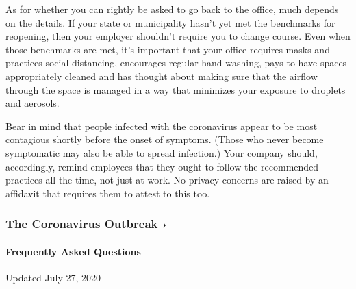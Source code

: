 As for whether you can rightly be asked to go back to the office, much
depends on the details. If your state or municipality hasn't yet met the
benchmarks for reopening, then your employer shouldn't require you to
change course. Even when those benchmarks are met, it's important that
your office requires masks and practices social distancing, encourages
regular hand washing, pays to have spaces appropriately cleaned and has
thought about making sure that the airflow through the space is managed
in a way that minimizes your exposure to droplets and aerosols.

Bear in mind that people infected with the coronavirus appear to be most
contagious shortly before the onset of symptoms. (Those who never become
symptomatic may also be able to spread infection.) Your company should,
accordingly, remind employees that they ought to follow the recommended
practices all the time, not just at work. No privacy concerns are raised
by an affidavit that requires them to attest to this too.

\href{https://www.nytimes3xbfgragh.onion/news-event/coronavirus?action=click\&pgtype=Article\&state=default\&region=MAIN_CONTENT_3\&context=storylines_faq}{}

\hypertarget{the-coronavirus-outbreak-}{%
\subsubsection{The Coronavirus Outbreak
›}\label{the-coronavirus-outbreak-}}

\hypertarget{frequently-asked-questions}{%
\paragraph{Frequently Asked
Questions}\label{frequently-asked-questions}}

Updated July 27, 2020

